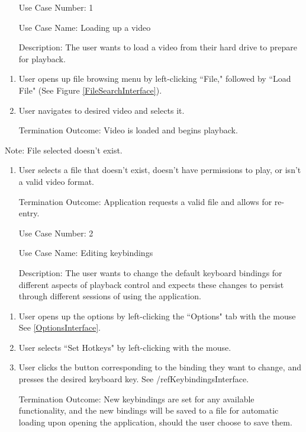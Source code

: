 \documentclass[10pt,conference,onecolumn,compsoc]{IEEEtran}
\begin{document}
\begin{itemize}
\item[Use Case Number:] 1
\item[Use Case Name:] Loading up a video
\item[Description:] The user wants to load a video from their hard drive to prepare for playback.
\end{itemize}

\begin{enumerate}
\item User opens up file browsing menu by left-clicking ``File," followed by ``Load File" (See Figure \ref{FileSearchInterface}).
\item User navigates to desired video and selects it.
\item[Termination Outcome:] Video is loaded and begins playback.
\end{enumerate}


Note: File selected doesn't exist.
\begin{enumerate}
\item User selects a file that doesn't exist, doesn't have permissions to play, or isn't a valid video format.
\item[Termination Outcome:] Application requests a valid file and allows for re-entry. 

\end{enumerate}
\begin{itemize}
\item[Use Case Number:] 2
\item[Use Case Name:] Editing keybindings
\item[Description:] The user wants to change the default keyboard bindings for different aspects of playback control and expects these changes to persist through different sessions of using the application.
\end{itemize}

\begin{enumerate}
\item User opens up the options by left-clicking the ``Options" tab with the mouse See \ref{OptionsInterface}.
\item User selects ``Set Hotkeys" by left-clicking with the mouse.
\item User clicks the button corresponding to the binding they want to change, and presses the desired keyboard key. See /ref{KeybindingsInterface}.
\item[Termination Outcome:] New keybindings are set for any available functionality, and the new bindings will be saved to a file for automatic loading upon opening the application, should the user choose to save them.
\end{enumerate}
\end{document}
